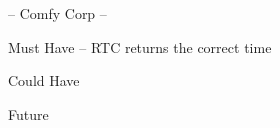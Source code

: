 -- Comfy Corp --
\begin{DoxyItemize}
\item Must Have -- R\-T\-C returns the correct time
\item Could Have
\item Future 
\end{DoxyItemize}